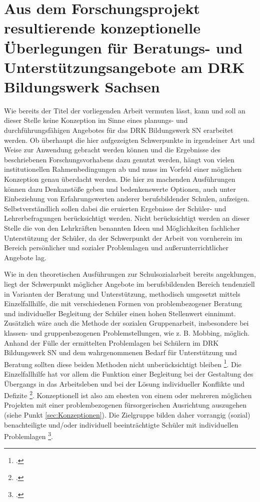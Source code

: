 \section[Konzeptionelle Überlegungen für das DRK Bildungswerk Sachsen]{Aus dem Forschungsprojekt resultierende konzeptionelle Überlegungen für Beratungs- und Unterstützungsangebote am DRK Bildungswerk Sachsen}
\label{sec:AusDemForschungsprojektResultierendeKonzeptionelleÜberlegungenFürBeratungsUndUnterstützungsangeboteAmDRKBildungswerkSachsen}

Wie bereits der Titel der vorliegenden Arbeit vermuten lässt, kann und soll an dieser Stelle keine Konzeption im Sinne eines planungs- und durchführungsfähigen Angebotes für das DRK Bildungswerk SN erarbeitet werden. Ob überhaupt die hier aufgezeigten Schwerpunkte in irgendeiner Art und Weise zur Anwendung gebracht werden können und die Ergebnisse des beschriebenen Forschungsvorhabens dazu genutzt werden, hängt von vielen institutionellen Rahmenbedingungen ab und muss im Vorfeld einer möglichen Konzeption genau überdacht werden. Die hier zu machenden Ausführungen können dazu Denkanstöße geben und bedenkenswerte Optionen, auch unter Einbeziehung von Erfahrungswerten anderer berufsbildender Schulen, aufzeigen. Selbstverständlich sollen dabei die eruierten Ergebnisse der Schüler- und Lehrerbefragungen berücksichtigt werden. Nicht berücksichtigt werden an dieser Stelle die von den Lehrkräften benannten Ideen und Möglichkeiten fachlicher Unterstützung der Schüler, da der Schwerpunkt der Arbeit von vornherein im Bereich persönlicher und sozialer Problemlagen und außerunterrichtlicher Angebote lag. 

Wie in den theoretischen Ausführungen zur Schulsozialarbeit bereits angeklungen, liegt der Schwerpunkt möglicher Angebote im berufsbildenden Bereich tendenziell in Varianten der Beratung und Unterstützung, methodisch umgesetzt mittels Einzelfallhilfe, die mit verschiedenen Formen von problembezogener Beratung und individueller Begleitung der Schüler einen hohen Stellenwert einnimmt. Zusätzlich wäre auch die Methode der sozialen Gruppenarbeit, insbesondere bei klassen- und gruppenbezogenen Problemstellungen, wie z. B. Mobbing, möglich. Anhand der Fülle der ermittelten Problemlagen bei Schülern im DRK Bildungswerk SN und dem wahrgenommenen Bedarf für Unterstützung und Beratung sollten diese beiden Methoden nicht unberücksichtigt bleiben \footcite[vgl.][10ff]{LSS2004}. Die Einzelfallhilfe hat vor allem die Funktion einer Begleitung bei der Gestaltung des Übergangs in das Arbeitsleben und bei der Lösung individueller Konflikte und Defizite \footcite[vgl.][74]{Stuewe2015}. Konzeptionell ist also am ehesten von einem oder mehreren möglichen Projekten mit einer problembezogenen fürsorgerischen Ausrichtung auszugehen (siehe Punkt \ref{sec:Konzeptionen}). Die Zielgruppe bilden daher vorrangig (sozial) benachteiligte und/oder individuell beeinträchtigte Schüler mit individuellen Problemlagen \footcite[vgl.][25f]{Speck2006}. 


